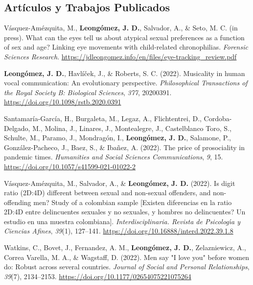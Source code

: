 \documentclass[11pt,a4paper,]{awesome-cv}
\begin{document}
\hypertarget{section}{%
\subsection{\texorpdfstring{\textbf{Artículos y Trabajos Publicados}}{}}\label{section}}

\begingroup
\setlength{\parindent}{-0.5in}
\setlength{\leftskip}{0.5in}

\hypertarget{refs_journals}{}
\leavevmode{}%
Vásquez-Amézquita, M., \textbf{Leongómez, J. D.}, Salvador, A., \& Seto,
M. C. (in press). {What can the eyes tell us about atypical sexual
preferences as a function of sex and age? Linking eye movements with
child-related chronophilias}. \emph{Forensic Sciences Research}.
\url{https://jdleongomez.info/en/files/eye-tracking_review.pdf}

\leavevmode{}%
\textbf{Leongómez, J. D.}, Havlíček, J., \& Roberts, S. C. (2022).
Musicality in human vocal communication: {An} evolutionary perspective.
\emph{Philosophical Transactions of the Royal Society B: Biological
Sciences}, \emph{377}, 20200391.
\url{https://doi.org/10.1098/rstb.2020.0391}

\leavevmode{}%
Santamaría-García, H., Burgaleta, M., Legaz, A., Flichtentrei, D.,
Cordoba-Delgado, M., Molina, J., Linares, J., Montealegre, J.,
Castelblanco Toro, S., Schulte, M., Paramo, J., Mondragón, I.,
\textbf{Leongómez, J. D.}, Salamone, P., González-Pacheco, J., Baez, S.,
\& Ibañez, A. (2022). The price of prosociality in pandemic times.
\emph{Humanities and Social Sciences Communications}, \emph{9}, 15.
\url{https://doi.org/10.1057/s41599-021-01022-2}

\leavevmode{}%
Vásquez-Amézquita, M., Salvador, A., \& \textbf{Leongómez, J. D.}
(2022). Is digit ratio (2D:4D) different between sexual and non-sexual
offenders, and non-offending men? Study of a colombian sample
{{[}Existen diferencias en la ratio 2D:4D entre delincuentes sexuales y
no sexuales, y hombres no delincuentes? Un estudio en una muestra
colombiana{]}}. \emph{Interdisciplinaria. Revista de Psicolog{ı́}a y
Ciencias Afines}, \emph{39}(1), 127--141.
\url{https://doi.org/10.16888/interd.2022.39.1.8}

\leavevmode{}%
Watkins, C., Bovet, J., Fernandez, A. M., \textbf{Leongómez, J. D.},
Zelazniewicz, A., Correa Varella, M. A., \& Wagstaff, D. (2022). {Men
say "I love you" before women do: Robust across several countries}.
\emph{Journal of Social and Personal Relationships}, \emph{39}(7),
2134--2153. \url{https://doi.org/10.1177/02654075221075264}
\end{document}
